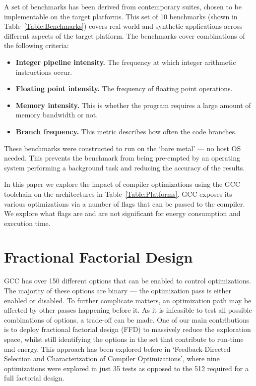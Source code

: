 \documentclass[twocolumn]{article}
\newcommand{\nsection}[1]{\section{\bfseries #1}}
\begin{document}
A set of benchmarks has been derived from contemporary suites, chosen to be implementable on the target platforms. This set of 10 benchmarks (shown in Table~\ref{Table:Benchmarks}) covers real world and synthetic applications across different aspects of the target platform. The benchmarks cover combinations of the following criteria:
\begin{itemize}
	\setlength{\itemsep}{0em}
	\vspace{-1mm}
	\item \textbf{Integer pipeline intensity.} The frequency at which integer arithmetic instructions occur.
	\item \textbf{Floating point intensity.} The frequency of floating point operations.
	\item \textbf{Memory intensity.} This is whether the program requires a large amount of memory bandwidth or not.
	\item \textbf{Branch frequency.} This metric describes how often the code branches.
\end{itemize}

These benchmarks were constructed to run on the `bare metal' --- no host OS needed. This prevents the benchmark from being pre-empted by an operating system performing a background task and reducing the accuracy of the results.


In this paper we explore the impact of compiler optimizations using the GCC toolchain on the architectures in Table~\ref{Table:Platforms}. GCC exposes its various optimizations via a number of flags that can be passed to the compiler. We explore what flags are and are not significant for energy consumption and execution time.

\nsection{Fractional Factorial Design}

GCC has over 150 different options that can be enabled to control optimizations. The majority of these options are binary --- the optimization pass is either enabled or disabled. To further complicate matters, an optimization path may be affected by other passes happening before it. As it is infeasible to test all possible combinations of options, a trade-off can be made. One of our main contributions is to deploy fractional factorial design (FFD) to massively reduce the exploration space, whilst still identifying the options in the set that contribute to run-time and energy. This approach has been explored before in `Feedback-Directed Selection and Characterization of Compiler Optimizations'\cite{IntelPaper}, where nine optimizations were explored in just 35 tests as opposed to the 512 required for a full factorial design.
\end{document}
